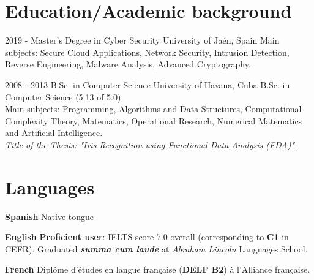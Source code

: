 \documentclass[]{friggeri-cv}
\begin{document}
\section{Education/Academic background}
\begin{entrylist}
  \entry
    {2019 - }
    {Master's Degree in Cyber Security}
    {University of Jaén, Spain}
    {
    	Main subjects: Secure Cloud Applications, Network Security, Intrusion Detection, Reverse Engineering, Malware Analysis, Advanced Cryptography.\\
    }

  \entry
    {2008 - 2013}
    {B.Sc. in Computer Science}
    {University of Havana, Cuba}
    {B.Sc. in Computer Science (5.13 of 5.0).\\ Main subjects: Programming, Algorithms and Data Structures, Computational Complexity Theory, Matematics, Operational Research, Numerical Matematics and Artificial Intelligence.\\
    \emph{Title of the Thesis: "Iris Recognition using Functional Data Analysis (FDA)".}}

\end{entrylist}

\section{Languages}
\begin{entrylist}
  \entry
    {\textbf{Spanish}}
    {}
    {}
    {Native tongue}      

  \entry
    {\textbf{English}}
    {}
    {}
    {
    	\textbf{Proficient user}: IELTS score 7.0 overall (corresponding to \textbf{C1} in CEFR). 
    	Graduated \textbf{\emph{summa cum laude}} at \emph{Abraham Lincoln} Languages School.\\
    }

  \entry
    {\textbf{French}}
    {}
    {}
    {Diplôme d'études en langue française (\textbf{DELF B2}) à l'Alliance française.}
\end{entrylist}
\end{document}
